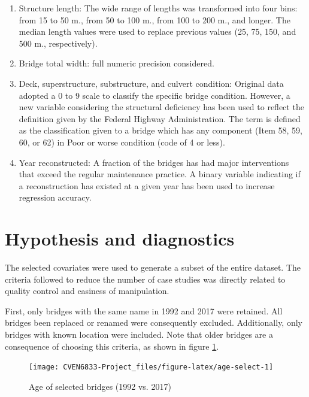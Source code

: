 \documentclass[]{book}
\theoremstyle{definition}
\theoremstyle{definition}
\theoremstyle{definition}
\theoremstyle{remark}
\begin{document}
\begin{enumerate}
\def\labelenumi{\arabic{enumi}.}
\setcounter{enumi}{6}
\item
  Structure length: The wide range of lengths was transformed into four
  bins: from 15 to 50 m., from 50 to 100 m., from 100 to 200 m., and
  longer. The median length values were used to replace previous values
  (25, 75, 150, and 500 m., respectively).
\item
  Bridge total width: full numeric precision considered.
\item
  Deck, superstructure, substructure, and culvert condition: Original
  data adopted a 0 to 9 scale to classify the specific bridge condition.
  However, a new variable considering the structural deficiency has been
  used to reflect the definition given by the Federal Highway
  Administration. The term is defined as the classification given to a
  bridge which has any component (Item 58, 59, 60, or 62) in Poor or
  worse condition (code of 4 or less).
\item
  Year reconstructed: A fraction of the bridges has had major
  interventions that exceed the regular maintenance practice. A binary
  variable indicating if a reconstruction has existed at a given year
  has been used to increase regression accuracy.
\end{enumerate}

\section{Hypothesis and diagnostics}\label{hypothesis-and-diagnostics}

The selected covariates were used to generate a subset of the entire
dataset. The criteria followed to reduce the number of case studies was
directly related to quality control and easiness of manipulation.

First, only bridges with the same name in 1992 and 2017 were retained.
All bridges been replaced or renamed were consequently excluded.
Additionally, only bridges with known location were included. Note that
older bridges are a consequence of choosing this criteria, as shown in
figure \ref{fig:age-select}.

\begin{figure}

{\centering \texttt{[image: CVEN6833-Project\_files/figure-latex/age-select-1]} 

}

\caption{Age of selected bridges (1992 vs. 2017)}\label{fig:age-select}
\end{figure}
\end{document}
